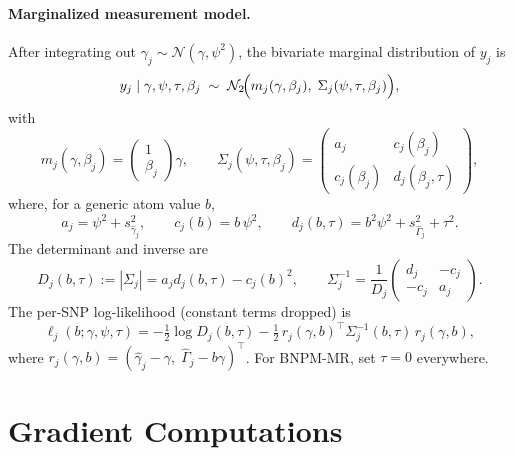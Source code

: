 \documentclass[12pt, a4paper]{article}
\theoremstyle{remark}
\newcommand{\Nor}{\mathcal{N}}
\begin{document}
\paragraph{Marginalized measurement model.}
After integrating out $\gamma_j \sim \Nor(\gamma,\psi^2)$,
the bivariate marginal distribution of $y_j$ is
\begin{equation}
  y_j \mid \gamma,\psi,\tau,\beta_j
  \;\sim\;
  \Nor_2\!\Bigl(m_j(\gamma,\beta_j),\;\Sigma_j(\psi,\tau,\beta_j)\Bigr),
\label{eq:marg_lik}
\end{equation}
with
\begin{equation}
  m_j(\gamma,\beta_j) = \begin{pmatrix}1\\\beta_j\end{pmatrix}\gamma,
  \qquad
  \Sigma_j(\psi,\tau,\beta_j)
  = \begin{pmatrix} a_j & c_j(\beta_j)\\
                    c_j(\beta_j) & d_j(\beta_j,\tau)\end{pmatrix},
\end{equation}
where, for a generic atom value $b$,
\begin{equation}
  a_j = \psi^2 + s^2_{\hat\gamma_j}, \qquad
  c_j(b) = b\,\psi^2, \qquad
  d_j(b,\tau) = b^2\psi^2 + s^2_{\hat\Gamma_j} + \tau^2.
\label{eq:acd}
\end{equation}
The determinant and inverse are
\begin{equation}
  D_j(b,\tau) := |\Sigma_j| = a_j d_j(b,\tau) - c_j(b)^2,
  \qquad
  \Sigma_j^{-1} = \frac{1}{D_j}
  \begin{pmatrix} d_j & -c_j \\ -c_j & a_j \end{pmatrix}.
\label{eq:det_inv}
\end{equation}
The per-SNP log-likelihood (constant terms dropped) is
\begin{equation}
  \ell_j(b;\gamma,\psi,\tau)
  = -\tfrac{1}{2}\log D_j(b,\tau)
    -\tfrac{1}{2}\,r_j(\gamma,b)^\top \Sigma_j^{-1}(b,\tau)\,r_j(\gamma,b),
\label{eq:loglik}
\end{equation}
where $r_j(\gamma,b) = (\hat\gamma_j - \gamma,\;\hat\Gamma_j - b\gamma)^\top$.
For BNPM-MR, set $\tau = 0$ everywhere.

\section{Gradient Computations}
\label{sec:gradients}
\end{document}
